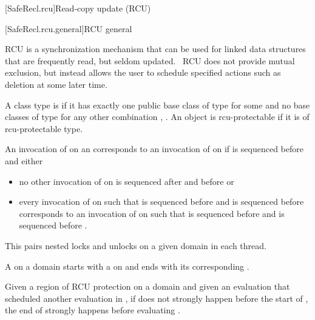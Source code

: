 
[SafeRecl.rcu]{Read-copy update (RCU)}

[SafeRecl.rcu.general]{RCU general}

\pnum
RCU is a synchronization mechanism that can be used for linked data
structures that are frequently read, but seldom updated.  RCU does
not provide mutual exclusion, but instead allows the user to schedule
specified actions such as deletion at some later time.

\pnum
A class type  is  if it has exactly one
public base class of type  for some 
and no base classes of type  for any other
combination , . An object is rcu-protectable if it is
of rcu-protectable type.

\pnum
An invocation of  on an  corresponds
to an invocation of  on  if  is
sequenced before  and either

\begin{itemize}
\item	no other invocation of  on  is sequenced
	after  and before  or
\item	every invocation of  on  such
	that  is sequenced before  and 
	is sequenced before  corresponds to an invocation of
	 on  such that  is sequenced
	before  and  is sequenced before .
\end{itemize}


\pnum
\begin{note}
This pairs nested locks and unlocks on a given domain in each thread.
\end{note}

\pnum
A  on a domain  starts
with a  on  and ends with its corresponding
.

\pnum
Given a region of RCU protection  on a domain 
and given an evaluation  that scheduled another evaluation
 in , if  does not strongly happen before
the start of , the end of  strongly happens before
evaluating .

